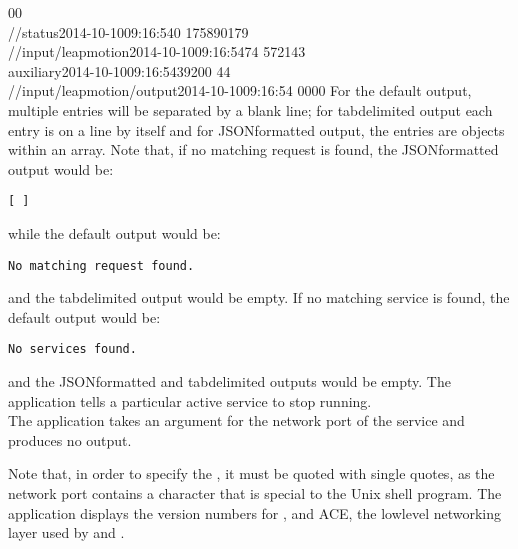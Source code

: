 0\pseudotab{}0\\
/\dollarService/status\pseudotab{}2014-10-10\pseudotab{}09:16:54\pseudotab{}0%
\pseudotab{}17589\pseudotab{}0\pseudotab{}179\\
/\serviceName/input/leapmotion\pseudotab{}2014-10-10\pseudotab{}09:16:54\pseudotab{}74%
\pseudotab{}5721\pseudotab{}4\pseudotab{}3\\
auxiliary\pseudotab{}2014-10-10\pseudotab{}09:16:54\pseudotab{}39\pseudotab{}200%
\pseudotab{}4\pseudotab{}4\\
/\serviceName/input/leapmotion/output\pseudotab{}2014-10-10\pseudotab{}09:16:54%
\pseudotab{}0\pseudotab{}0\pseudotab{}0\pseudotab{}0
\outputEnd{}
For the default output, multiple entries will be separated by a blank line; for
tab\longDash{}delimited output each entry is on a line by itself and for
JSON\longDash{}formatted output, the entries are objects within an array.
Note that, if no matching request is found, the JSON\longDash{}formatted output would be:
\outputBegin
\begin{verbatim}
[ ]
\end{verbatim}
\outputEnd{}
while the default output would be:
\outputBegin
\begin{verbatim}
No matching request found.
\end{verbatim}
\outputEnd{}
and the tab\longDash{}delimited output would be empty.
If no matching service is found, the default output would be:
\outputBegin
\begin{verbatim}
No services found.
\end{verbatim}
\outputEnd{}
and the JSON\longDash{}formatted and tab\longDash{}delimited outputs would be empty.
\condPage
{}
The application  tells a particular active service to stop
running.\\

The application takes an argument for the \yarp{} network port of the service and produces
no output.
\insertShortUtilityParameters{}

Note that, in order to specify the , it
must be quoted with single quotes, as the network port contains a character that is
special to the Unix shell program.
The application  displays the version numbers for \mplusm,
\yarp{} and ACE, the low\longDash{}level networking layer used by \mplusm{} and \yarp.\\

